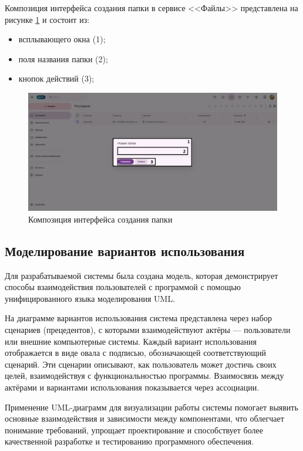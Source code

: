 Композиция интерфейса создания папки в сервисе <<Файлы>> представлена на рисунке \ref{templ:image9d} и состоит из:
\begin{itemize}
  \item всплывающего окна (1);
  \item поля названия папки (2);
  \item кнопок действий (3);
\end{itemize}
\begin{figure}[H]
	\centering
	\includegraphics[width=1\linewidth]{images/файлы4}
	\caption{Композиция интерфейса создания папки}
	\label{templ:image9d}
\end{figure}

\clearpage
\subsection{Моделирование вариантов использования}

Для разрабатываемой системы была создана модель, которая демонстрирует способы взаимодействия пользователей с программой с помощью унифицированного языка моделирования UML.

На диаграмме вариантов использования система представлена через набор сценариев (прецедентов), с которыми взаимодействуют актёры — пользователи или внешние компьютерные системы. Каждый вариант использования отображается в виде овала с подписью, обозначающей соответствующий сценарий. Эти сценарии описывают, как пользователь может достичь своих целей, взаимодействуя с функциональностью программы. Взаимосвязь между актёрами и вариантами использования показывается через ассоциации.

Применение UML-диаграмм для визуализации работы системы помогает выявить основные взаимодействия и зависимости между компонентами, что облегчает понимание требований, упрощает проектирование и способствует более качественной разработке и тестированию программного обеспечения.

